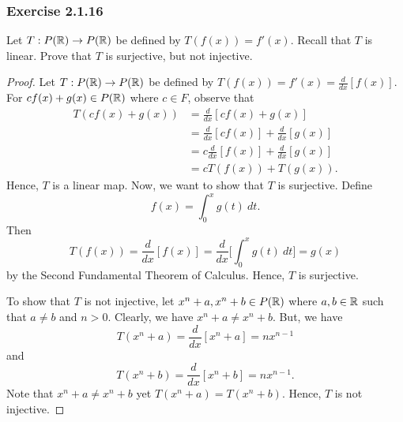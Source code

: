 \subsubsection{Exercise 2.1.16} Let \( T: P(\mathbb{R}) \to P(\mathbb{R}) \) be defined by \( T(f(x)) = f'(x)  \). Recall that \( T  \) is linear. Prove that \( T  \) is surjective, but not injective.
\begin{proof}
    Let \( T: P(\mathbb{R}) \to P(\mathbb{R}) \) be defined by \( T(f(x)) = f'(x) = \frac{d  }{d x } [f(x)]  \). For \( cf(x) + g(x)  \in P(\mathbb{R})  \) where \( c \in F  \), observe that
    \begin{align*}
        T(cf(x) + g(x)) &= \frac{d  }{d x }  [cf(x) + g(x)] \\
                        &= \frac{d  }{d x } [cf(x)] + \frac{d  }{d x } [g(x)] \\
                        &= c \frac{d  }{d x } [f(x)] + \frac{d  }{d x } [g(x)] \\
                        &= cT(f(x)) + T(g(x)).
    \end{align*}
    Hence, \( T  \) is a linear map. Now, we want to show that \( T  \) is surjective. Define 
    \[  f(x) = \int_{ 0 }^{ x }  g(t)  \ dt. \]
    Then 
    \[  T(f(x)) = \frac{d  }{d x } [f(x)] = \frac{d  }{d x }  \Big[ \int_{ 0 }^{ x }  g(t) \ dt \Big] = g(x) \]
    by the Second Fundamental Theorem of Calculus. Hence, \( T  \) is surjective. 

    To show that \( T  \) is not injective, let \( x^{n} + a, x^{n} + b \in P(\mathbb{R}) \) where \( a, b \in \mathbb{R}  \) such that \( a \neq b   \) and \( n > 0   \). Clearly, we have \( x^{n} + a \neq x^{n} + b  \). But, we have
    \[  T(x^{n} + a) = \frac{d  }{d x }  [x^{n} + a]  = n x^{n-1}\]
    and 
    \[  T(x^{n} + b) = \frac{d  }{d x} [x^{n} + b] = nx^{n-1}.  \]
    Note that \( x^{n} + a \neq x^{n} + b \) yet \( T(x^{n} +a) = T(x^{n} +b)  \). Hence, \( T  \) is not injective.
\end{proof}

